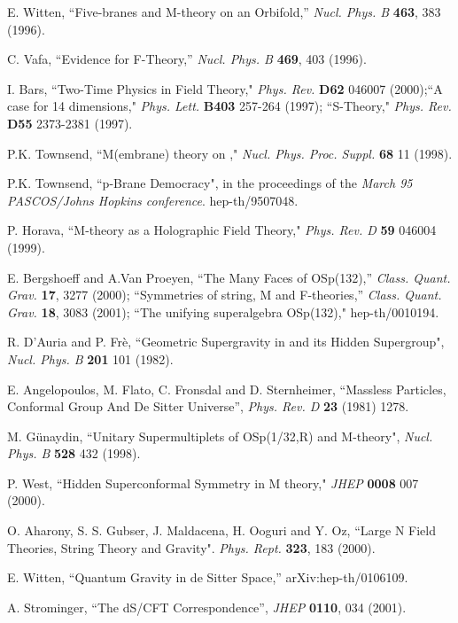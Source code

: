 \documentclass[a4paper,12pt]{article}
\begin{document}
\begin{thebibliography}{99}
E. Witten, ``Five-branes and M-theory on an Orbifold,'' {\it Nucl.
Phys. B} {\bf 463}, 383 (1996).

C. Vafa, ``Evidence for F-Theory,'' {\it Nucl. Phys. B} {\bf 469},
403 (1996).

 I. Bars, ``Two-Time Physics in Field Theory,"
{\it Phys. Rev.} {\bf D62} 046007 (2000);``A case for 14
dimensions," {\it Phys. Lett.} {\bf B403} 257-264 (1997);
``S-Theory," {\it Phys. Rev.} {\bf D55} 2373-2381 (1997).

 P.K. Townsend, ``M(embrane) theory on \coordHE{},"
 {\it Nucl. Phys. Proc. Suppl.} {\bf 68} 11 (1998).

  P.K. Townsend, ``p-Brane Democracy",
 in the proceedings of the {\it March 95 PASCOS/Johns
Hopkins conference}. hep-th/9507048.

  P. Horava, ``M-theory as a Holographic Field Theory,"
  {\it Phys. Rev. D} {\bf 59} 046004 (1999).

E. Bergshoeff and A.Van Proeyen, ``The Many Faces of
OSp(1\myHighlight{$|$}\coordHE{}32),'' {\it Class. Quant. Grav.}  {\bf 17}, 3277 (2000);
``Symmetries of string, M and F-theories,'' {\it Class. Quant.
Grav.} {\bf 18}, 3083 (2001); ``The unifying superalgebra
OSp(1\myHighlight{$|$}\coordHE{}32)," hep-th/0010194.

 R. D'Auria and P. Fr\`e,
 ``Geometric Supergravity in \coordHE{} and its Hidden Supergroup",
  {\it Nucl. Phys. B} {\bf 201} 101 (1982).

E. Angelopoulos, M. Flato, C. Fronsdal and D. Sternheimer,
``Massless Particles, Conformal Group And De Sitter Universe'',
{\it Phys. Rev. D} {\bf 23} (1981) 1278.

 M. G\"unaydin, ``Unitary Supermultiplets of OSp(1/32,R) and M-theory",
 {\it Nucl. Phys. B} {\bf 528} 432 (1998).

   P. West, ``Hidden Superconformal Symmetry in M theory,"
 {\it JHEP} {\bf 0008} 007 (2000).


O. Aharony, S. S. Gubser, J. Maldacena, H. Ooguri and Y. Oz,
``Large N Field Theories, String Theory and Gravity". {\it Phys.
Rept.} {\bf 323}, 183 (2000).



E. Witten, ``Quantum Gravity in de Sitter Space,''
arXiv:hep-th/0106109.

A. Strominger, ``The dS/CFT Correspondence'', {\it JHEP} {\bf
0110}, 034 (2001).


\end{thebibliography}
\end{document}

